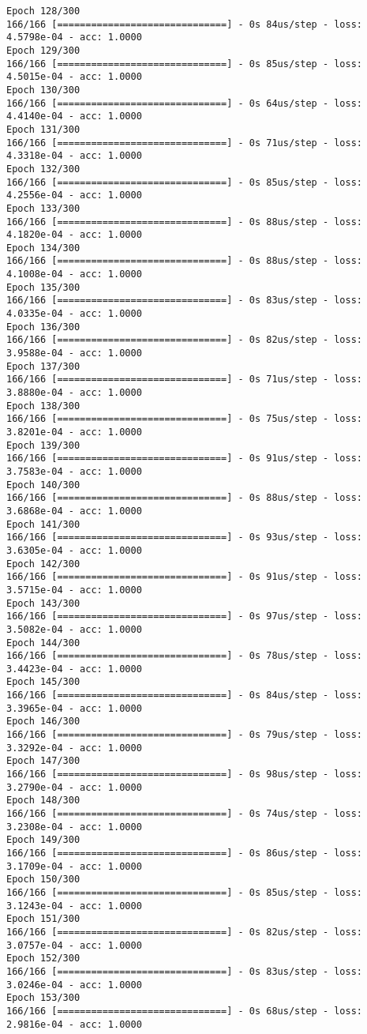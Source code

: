 \documentclass[11pt]{article}
\begin{document}
\begin{Verbatim}[commandchars=\\\{\}]
Epoch 128/300
166/166 [==============================] - 0s 84us/step - loss: 4.5798e-04 - acc: 1.0000
Epoch 129/300
166/166 [==============================] - 0s 85us/step - loss: 4.5015e-04 - acc: 1.0000
Epoch 130/300
166/166 [==============================] - 0s 64us/step - loss: 4.4140e-04 - acc: 1.0000
Epoch 131/300
166/166 [==============================] - 0s 71us/step - loss: 4.3318e-04 - acc: 1.0000
Epoch 132/300
166/166 [==============================] - 0s 85us/step - loss: 4.2556e-04 - acc: 1.0000
Epoch 133/300
166/166 [==============================] - 0s 88us/step - loss: 4.1820e-04 - acc: 1.0000
Epoch 134/300
166/166 [==============================] - 0s 88us/step - loss: 4.1008e-04 - acc: 1.0000
Epoch 135/300
166/166 [==============================] - 0s 83us/step - loss: 4.0335e-04 - acc: 1.0000
Epoch 136/300
166/166 [==============================] - 0s 82us/step - loss: 3.9588e-04 - acc: 1.0000
Epoch 137/300
166/166 [==============================] - 0s 71us/step - loss: 3.8880e-04 - acc: 1.0000
Epoch 138/300
166/166 [==============================] - 0s 75us/step - loss: 3.8201e-04 - acc: 1.0000
Epoch 139/300
166/166 [==============================] - 0s 91us/step - loss: 3.7583e-04 - acc: 1.0000
Epoch 140/300
166/166 [==============================] - 0s 88us/step - loss: 3.6868e-04 - acc: 1.0000
Epoch 141/300
166/166 [==============================] - 0s 93us/step - loss: 3.6305e-04 - acc: 1.0000
Epoch 142/300
166/166 [==============================] - 0s 91us/step - loss: 3.5715e-04 - acc: 1.0000
Epoch 143/300
166/166 [==============================] - 0s 97us/step - loss: 3.5082e-04 - acc: 1.0000
Epoch 144/300
166/166 [==============================] - 0s 78us/step - loss: 3.4423e-04 - acc: 1.0000
Epoch 145/300
166/166 [==============================] - 0s 84us/step - loss: 3.3965e-04 - acc: 1.0000
Epoch 146/300
166/166 [==============================] - 0s 79us/step - loss: 3.3292e-04 - acc: 1.0000
Epoch 147/300
166/166 [==============================] - 0s 98us/step - loss: 3.2790e-04 - acc: 1.0000
Epoch 148/300
166/166 [==============================] - 0s 74us/step - loss: 3.2308e-04 - acc: 1.0000
Epoch 149/300
166/166 [==============================] - 0s 86us/step - loss: 3.1709e-04 - acc: 1.0000
Epoch 150/300
166/166 [==============================] - 0s 85us/step - loss: 3.1243e-04 - acc: 1.0000
Epoch 151/300
166/166 [==============================] - 0s 82us/step - loss: 3.0757e-04 - acc: 1.0000
Epoch 152/300
166/166 [==============================] - 0s 83us/step - loss: 3.0246e-04 - acc: 1.0000
Epoch 153/300
166/166 [==============================] - 0s 68us/step - loss: 2.9816e-04 - acc: 1.0000

\end{Verbatim}
\end{document}
